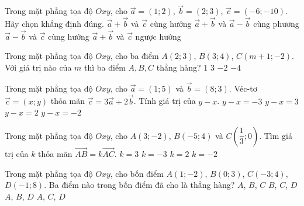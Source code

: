 \begin{ex}%
	Trong mặt phẳng tọa độ $Oxy$, cho $\vec{a}=(1;2)$, $\vec{b}=(2;3)$, $\vec{c}=(-6;-10)$. Hãy chọn khẳng định đúng.
	\choice
	{$\vec{a}+\vec{b}$ và $\vec{c}$ cùng hướng}
	{$\vec{a}+\vec{b}$ và $\vec{a}-\vec{b}$ cùng phương}
	{$\vec{a}-\vec{b}$ và $\vec{c}$ cùng hướng}
	{\True $\vec{a}+\vec{b}$ và $\vec{c}$ ngược hướng}
\end{ex}
\begin{ex}%
	Trong mặt phẳng tọa độ $Oxy$, cho ba điểm $A(2;3)$, $B(3;4)$, $C(m+1;-2)$. Với giá trị nào của $m$ thì ba điểm $A,B,C$ thẳng hàng?
	\choice
	{$1$}
	{$3$}
	{$-2$}
	{\True $-4$}
\end{ex}
\begin{ex}%
	Trong mặt phẳng tọa độ $Oxy$, cho $\vec{a}=(1;5)$ và $\vec{b}=(8;3)$. Véc-tơ $\vec{c}=(x;y)$ thỏa mãn $\vec{c}=3\vec{a}+2\vec{b}$. Tính giá trị của $y-x$.
	\choice
	{$y-x=-3$}
	{$y-x=3$}
	{\True $y-x=2$}
	{$y-x=-2$}
\end{ex}
\begin{ex}%
	Trong mặt phẳng tọa độ $Oxy$, cho $A(3;-2)$, $B(-5;4)$ và $C\left(\dfrac{1}{3};0\right)$. Tìm giá trị của $k$ thỏa mãn $\vec{AB}=k\vec{AC}$.
	\choice
	{\True $k=3$}
	{$k=-3$}
	{$k=2$}
	{$k=-2$}
\end{ex}
\begin{ex}%
	Trong mặt phẳng tọa độ $Oxy$, cho bốn điểm $A(1;-2)$, $B(0;3)$, $C(-3;4)$, $D(-1;8)$. Ba điểm nào trong bốn điểm đã cho là thẳng hàng? 
	\choice
	{$A$, $B$, $C$}
	{$B$, $C$, $D$}
	{\True $A$, $B$, $D$}
	{$A$, $C$, $D$}
\end{ex}
